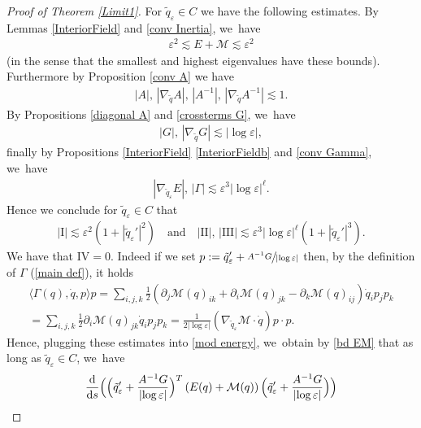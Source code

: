 \documentclass[JEP,XML,SOM,Unicode,published]{cedram}
\let\epsilon\varepsilon
\newcommand{\rI}{\mathrm{I}}
\newcommand{\rII}{\mathrm{II}}
\newcommand{\rIII}{\mathrm{III}}
\newcommand{\rIV}{\mathrm{IV}}
\theoremstyle{definition}
\newcommand\eq{=}
\let\de\partial
\let\eps\epsilon
\let\mel\relax
\begin{document}
\begin{proof}[Proof of Theorem \ref{Limit1}]
For $\tilde{q}_\eps\in C$ we have the following estimates. 
By Lemmas \ref{InteriorField} and \ref{conv Inertia}, we~have\vspace*{-3pt}
\begin{align}\label{bd EM}
\eps^2\lesssim E+\mathcal{M}\lesssim \eps^2
\end{align}
(in the sense that the smallest and highest eigenvalues have these bounds). Furthermore by Proposition \ref{conv A} we have\vspace*{-3pt}
\begin{align}\label{bd A}
|A|,\,|\nabla_{\tilde{q}}A|,\, |A^{-1}|,\,|\nabla_{\tilde{q}}A^{-1}|\lesssim 1.
\end{align}
By Propositions \ref{diagonal A} and \ref{crossterms G}, we~have\vspace*{-3pt}
\begin{align}\label{bd G}
|G|,\, |\nabla_{\tilde{q}} G|\lesssim |{\log\eps}|,
\end{align}
finally by Propositions \ref{InteriorField} \eqref{InteriorFieldb} and \ref{conv Gamma}, we~have\vspace*{-3pt}
\begin{align}\label{bd deri M}
|\nabla_{\tilde{q}_\eps}E|,\,|\Gamma|\lesssim \eps^3|{\log\eps}|^\ell.
\end{align}
Hence we conclude for $\tilde{q}_\eps\in C$ that
\begin{align*}
|\rI|\lesssim \eps^2(1+|\tilde{q}_\eps'|^2)\quad\text{and}\quad
|\rII|,\,|\rIII|\lesssim \eps^3|{\log\eps}|^\ell(1+|\tilde{q}_\eps'|^3).
\end{align*}
We have that $\rIV=0$. Indeed if we set $p:=\tilde{q}_\eps'+\sfrac{A^{-1}G}{|{\log\eps}|}$ then, by the definition of $\Gamma$ (\ref{main def}), it holds
\begin{align*}
\langle\Gamma(q),\dot{q},p\rangle p\eq\sum_{i,j,k}\frac{1}{2}(\de_j\mathcal{M}(q)_{ik}+\de_i\mathcal{M}(q)_{jk}-\de_k\mathcal{M}(q)_{ij})\dot{q}_ip_jp_k\\
=\sum_{i,j,k}\frac{1}{2}\de_i\mathcal{M}(q)_{jk}\dot{q}_ip_jp_k\eq\frac{1}{2|{\log\eps}|}(\nabla_{\tilde{q}_\eps}\mathcal{M}\cdot\dot{q})p\cdot p.
\end{align*}
Hence, plugging these estimates into \eqref{mod energy}, we~obtain by \eqref{bd EM} that as long as $\tilde{q}_\eps\in C$, we~have
\begin{multline}\label{1st Gronwall}
\mel\frac{\text{d}}{\text{d}s} \Bigl(\Bigl(\tilde{q}_\eps'+\frac{A^{-1}G}{|{\log\eps}|} \Bigr)^T\left(E(q)+\mathcal{M}(q)\right) \Bigl(\tilde{q}_\eps'+\frac{A^{-1}G}{|{\log\eps}|} \Bigr) \Bigr)\\

\end{multline}
\end{proof}
\end{document}
